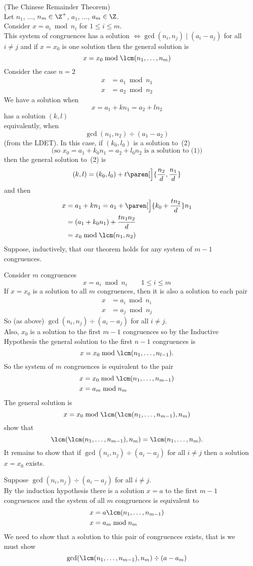 \thm (The Chinese Remainder Theorem) \\
Let $n_1$, $\dotsc$, $n_m\in\Z^+$, $a_1$, $\dotsc$, $a_m\in\Z$. \\
Consider $x=a_i\bmod n_i$ for $1\leq i\leq m$. \\
This system of congruences has a solution $\iff\gcd(n_i,n_j)\mid(a_i-a_j)$ for all $i\neq j$ and if $x=x_0$ is one solution then the general solution is
\[ x = x_0 \bmod \lcm(n_1,\dotsc,n_m) \]
\pf Consider the case $n=2$
\[
\begin{aligned}
x &= a_1 \bmod n_1 \\
x &= a_2 \bmod n_2
\end{aligned} \tag{1}
\]
We have a solution when
\[ x = a_1 + k n_1 = a_2 + l n_2 \tag{2} \]
has a solution $(k,l)$ \\
equivalently, when
\[ \gcd(n_1,n_2)\div(a_1-a_2) \]
(from the LDET).  In this case, if $(k_0,l_0)$ is a solution to~(2)
\[ \text{(so $x_0=a_1+k_0n_1=a_2+l_0n_2$ is a solution to~(1))} \]
then the general solution to~(2) is
\[ (k,l) = (k_0,l_0) + t\paren[\Big]{\frac{n_2}{d},\frac{n_1}{d}} \]
and then
\begin{align*}
x &= a_1 + kn_1 = a_1 + \paren[\Big]{k_0+\frac{tn_2}{d}}n_1 \\
&= (a_1+k_0n_1) + \frac{tn_1n_2}{d} \\
&= x_0 \bmod \lcm(n_1,n_2)
\end{align*}
Suppose, inductively, that our theorem holds for any system of $m-1$ congruences.

Consider $m$ congruences
\[ x = a_i \bmod n_i \qquad 1\leq i\leq m \]
If $x=x_0$ is a solution to all $m$ congruences, then it is also a solution to each pair
\begin{align*}
x &= a_i \bmod n_i \\
x &= a_j \bmod n_j
\end{align*}
So (as above) $\gcd(n_i,n_j)\div(a_i-a_j)$ for all $i\neq j$. \\
Also, $x_0$ is a solution to the first $m-1$ congruences so by the Inductive Hypothesis the general solution to the first $n-1$ congruences is
\[ x = x_0 \bmod \lcm(n_1,\dotsc,n_{l-1}) . \]
So the system of $m$ congruences is equivalent to the pair
\begin{align*}
x &= x_0 \bmod \lcm(n_1,\dotsc,n_{m-1}) \\
x &= a_m \bmod n_m
\end{align*}
The general solution is
\[ x = x_0 \bmod \lcm(\lcm(n_1,\dotsc,n_{m-1}),n_m) \]
\ex show that
\[ \lcm(\lcm(n_1,\dotsc,n_{m-1}),n_m) = \lcm(n_1,\dotsc,n_m) . \]
It remains to show that if $\gcd(n_i,n_j)\div(a_i-a_j)$ for all $i\neq j$ then a solution $x=x_0$ exists.

Suppose $\gcd(n_i,n_j)\div(a_i-a_j)$ for all $i\neq j$. \\
By the induction hypothesis there is a solution $x=a$ to the first $m-1$ congruences and the system of all $m$ congruences is equivalent to
\begin{align*}
x &= a\lcm(n_1,\dotsc,n_{m-1}) \\
x &= a_m \bmod n_m
\end{align*}
We need to show that a solution to this pair of congruences exists, that is we must show
\[ \gcd(\lcm(n_1,\dotsc,n_{m-1}),n_m)\div(a-a_m) \]
